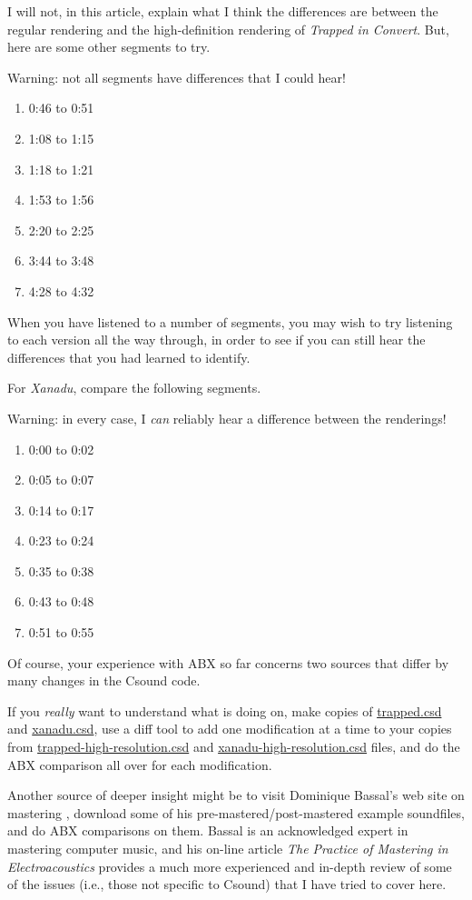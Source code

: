 \documentclass[english,11pt,letterpaper,onecolumn]{scrartcl}
\begin{document}
I will not, in this article, explain what I think the differences are between 
the regular rendering and the high-definition rendering of \emph{Trapped in 
Convert}. But, here are some other segments to try. 

Warning: not all segments have differences that I could hear!

\begin{enumerate}
	\item 0:46 to 0:51
	\item 1:08 to 1:15
	\item 1:18 to 1:21
	\item 1:53 to 1:56
	\item 2:20 to 2:25
	\item 3:44 to 3:48
	\item 4:28 to 4:32
\end{enumerate}

\noindent When you have listened to a number of segments, you may wish to try 
listening to each version all the way through, in order to see if you can 
still hear the differences that you had learned to identify.

For \emph{Xanadu}, compare the following segments.

Warning: in every case, I \emph{can} reliably hear a difference between the 
renderings!

\begin{enumerate}
	\item 0:00 to 0:02
	\item 0:05 to 0:07
	\item 0:14 to 0:17
	\item 0:23 to 0:24
	\item 0:35 to 0:38
	\item 0:43 to 0:48
	\item 0:51 to 0:55
\end{enumerate}

Of course, your experience with ABX so far concerns two sources that differ by 
many changes in the Csound code. 

If you \emph{really} want to understand what is doing on, make copies of 
\url{trapped.csd} and \url{xanadu.csd}, use a diff tool to add one modification 
at a time to your copies from \url{trapped-high-resolution.csd} and 
\url{xanadu-high-resolution.csd} files, and do the ABX comparison all over for 
each modification.

Another source of deeper insight might be to visit Dominique Bassal's web site 
on mastering \cite{bassal_mastering}, download some of his 
pre-mastered/post-mastered example soundfiles, and do ABX comparisons on them. 
Bassal is an acknowledged expert in mastering computer music, and his on-line 
article \emph{The Practice of Mastering in Electroacoustics} 
\cite{bassal_mastering_pdf} provides a much more experienced and in-depth 
review of some of the issues (i.e., those not specific to Csound) that I have 
tried to cover here.
\end{document}
